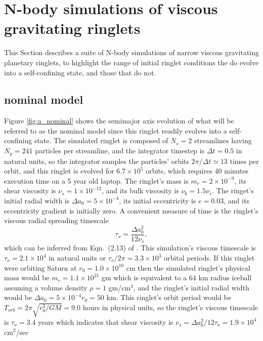 \documentclass[preprint]{aastex62}
\begin{document}
\section{N-body simulations of viscous gravitating ringlets}
\label{sec:nbody}

This Section describes a suite of N-body simulations of narrow viscous gravitating planetary
ringlets, to highlight the range of initial ringlet conditions the do evolve into
a self-confining state, and those that do not.

\subsection{nominal model}
\label{subsec:nominal}

Figure \ref{fig:a_nominal} shows the semimajor axis evolution of what will be referred to
as the nominal model since this ringlet readily evolves into a self-confining state.
The simulated ringlet is composed of $N_s=2$ streamlines having $N_p=241$ particles
per streamline, and the integrator timestep is $\Delta t=0.5$ in natural units, so
the integrator samples the particles' orbits $2\pi/\Delta t\simeq13$ times per orbit, and this
ringlet is evolved for $6.7\times10^5$ orbits, which requires 40 minutes execution time
on a 5 year old laptop. The ringlet's mass is
$m_r=2\times10^{-9}$, its shear viscosity is $\nu_s=1\times10^{-12}$, and its
bulk viscosity is $\nu_b=1.5\nu_s$. The ringet's initial radial width is
$\Delta a_0 = 5\times10^{-4}$, its initial eccentricity is $e=0.03$, and its
eccentricity gradient is initially zero. A convenient measure of time is the ringlet's
viscous radial spreading timescale
\begin{equation}
\label{eqn:viscous-timesscale}
    \tau_\nu=\frac{\Delta a_0^2}{12\nu_s}, 
\end{equation}
which can be inferred from Eqn.\ (2.13) of \cite{P81}. 
This simulation's viscous timescale is $\tau_\nu=2.1\times10^4$ in natural units
or $\tau_\nu/2\pi=3.3\times10^3$ orbital periods. If this ringlet were orbiting Saturn
at $r_0=1.0\times10^{10}$ cm then the simulated ringlet's physical mass
would be $m_r=1.1\times10^{21}$ gm which is equivalent to a $64$ km radius iceball assuming
a volume density $\rho=1$ gm/cm$^3$, and the ringlet's initial radial width would be
$\Delta a_0 = 5\times10^{-4}r_0=50$ km. This ringlet's
orbit period would be $T_{orb}=2\pi\sqrt{r_0^3/GM}=9.0$ hours in physical units, so 
the ringlet's viscous timescale is $\tau_\nu=3.4$ years 
which indicates that shear viscosity is $\nu_s=\Delta a_0^2/12\tau_\nu = 1.9\times10^4$ cm$^2$/sec
\end{document}
